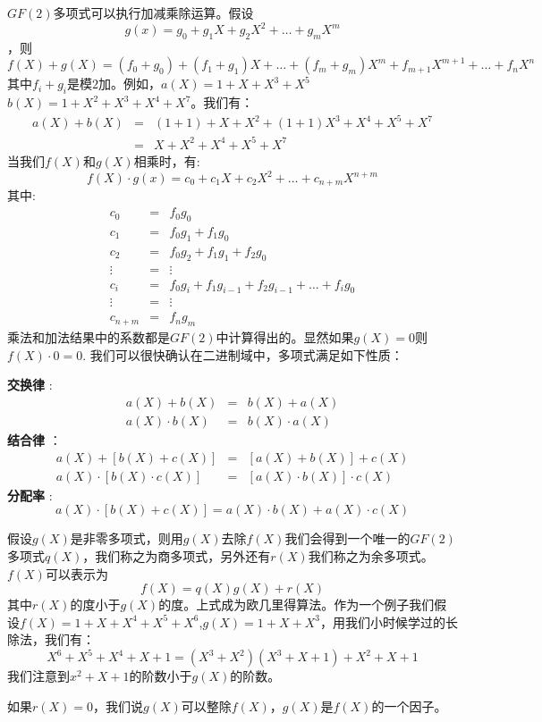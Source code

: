 \documentclass[10pt,a4paper,UTF8]{article}
\begin{document}
\(GF(2)\)多项式可以执行加减乘除运算。假设\[g(x) = g_{0} + g_{1}X + g_{2}X^{2} + \ldots + g_{m}X^{m}\]，则
\begin{equation*}
\label{eq:4}
f(X) + g(X) = (f_{0} + g_{0}) + (f_{1} + g_{1})X + \ldots + (f_{m} + g_{m})X^{m} + f_{m+1}X^{m+1} + \ldots + f_{n}X^{n}
\end{equation*}
其中\(f_{i} + g_{i}\)是模\(2\)加。例如，\(a(X) = 1+ X + X^{3} + X^{5}\) \(b(X) = 1 + X^{2} + X^{3} + X^{4} + X^{7}\)。我们有：
\begin{eqnarray*}
a(X) + b(X) &=& (1+1) +  X + X^{2} + (1+1)X^{3} + X^{4} + X^{5} + X^{7} \\
            &=& X + X^{2} + X^{4} + X^{5} + X^{7}
\end{eqnarray*}
当我们\(f(X)\)和\(g(X)\)相乘时，有:
\[f(X)\cdot g(x) = c_{0} + c_{1}X + c_{2}X^{2} + \ldots + c_{n+m}X^{n+m}\]
其中:
\begin{eqnarray*}
c_{0}&=&f_{0}g_{0} \\
c_{1}&=&f_{0}g_{1} + f_{1}g_{0} \\
c_{2}&=&f_{0}g_{2} + f_{1}g_{1} + f_{2}g_{0} \\
\vdots &=& \vdots \\
c_{i}&=&f_{0}g_{i} + f_{1}g_{i-1} + f_{2}g_{i-1} + \ldots + f_{i}g_{0} \\
\vdots &=& \vdots \\
c_{n+m} &=&f_{n}g_{m}
\end{eqnarray*}
乘法和加法结果中的系数都是\(GF(2)\)中计算得出的。显然如果\(g(X)=0\)则\(f(X)\cdot 0 =0\). 我们可以很快确认在二进制域中，多项式满足如下性质：

\textbf{交换律}  :
\begin{eqnarray*}
a(X) + b(X)&=& b(X) + a(X) \\
a(X)\cdot b(X)&=&b(X)\cdot a(X)
\end{eqnarray*}
\textbf{结合律} ：
\begin{eqnarray*}
a(X) + [b(X) + c(X)]&=& [a(X)+b(X)] + c(X) \\
a(X)\cdot [b(X)\cdot c(X)] &=&[a(X)\cdot b(X)]\cdot c(X)
\end{eqnarray*}
\textbf{分配率} :
\begin{equation*}
a(X)\cdot [b(X) + c(X)] = a(X)\cdot b(X) + a(X)\cdot c(X)
\end{equation*}

假设\(g(X)\)是非零多项式，则用\(g(X)\)去除\(f(X)\)我们会得到一个唯一的\(GF(2)\)多项式\(q(X)\)，我们称之为商多项式，另外还有\(r(X)\)我们称之为余多项式。\(f(X)\)可以表示为\[f(X)=q(X)g(X) + r(X)\]
其中\(r(X)\)的度小于\(g(X)\)的度。上式成为欧几里得算法。作为一个例子我们假设\(f(X) = 1+X+X^{4}+X^{5}+X^{6}\),\(g(X)=1+X+X^{3}\)，用我们小时候学过的长除法，我们有：\[X^{6}+X^{5}+X^{4}+X+1=(X^{3}+X^{2})(X^{3}+X+1) + X^{2} + X + 1\] 我们注意到\(x^{2} + X + 1\)的阶数小于\(g(X)\)的阶数。

如果\(r(X)=0\)，我们说\(g(X)\)可以整除\(f(X)\)，\(g(X)\)是\(f(X)\)的一个因子。
\end{document}
